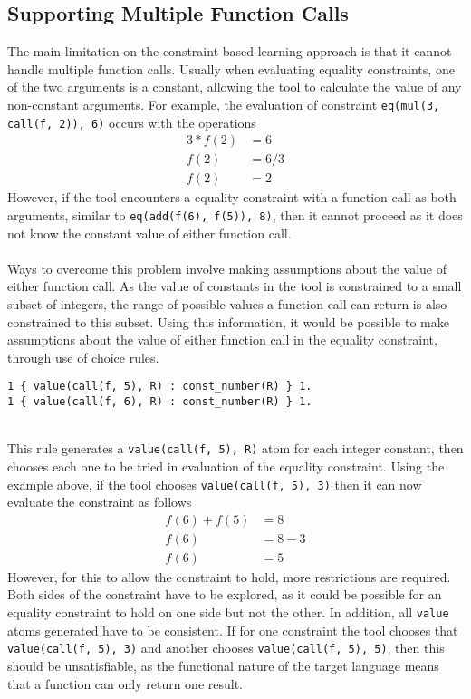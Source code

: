 \subsection{Supporting Multiple Function Calls}
The main limitation on the constraint based learning approach is that it cannot handle multiple function calls. Usually when evaluating equality constraints, one of the two arguments is a constant, allowing the tool to calculate the value of any non-constant arguments. For example, the evaluation of constraint \lstinline{eq(mul(3, call(f, 2)), 6)} occurs with the operations %
\begin{align*}
3 * f(2) &= 6 \\
f(2) &=  6 / 3 \\
f(2) &= 2
\end{align*}
However, if the tool encounters a equality constraint with a function call as both arguments, similar to \lstinline{eq(add(f(6), f(5)), 8)}, then it cannot proceed as it does not know the constant value of either function call. \\ \\%
Ways to overcome this problem involve making assumptions about the value of either function call. As the value of constants in the tool is constrained to a small subset of integers, the range of possible values a function call can return is also constrained to this subset. Using this information, it would be possible to make assumptions about the value of either function call in the equality constraint, through use of choice rules. \\
\begin{lstlisting}
1 { value(call(f, 5), R) : const_number(R) } 1. 
1 { value(call(f, 6), R) : const_number(R) } 1. 
\end{lstlisting}  
\mbox{} \\
This rule generates a \lstinline{value(call(f, 5), R)} atom for each integer constant, then chooses each one to be tried in evaluation of the equality constraint. Using the example above, if the tool chooses \lstinline{value(call(f, 5), 3)} then it can now evaluate the constraint as follows
\begin{align*}
f(6) + f(5) &= 8 \\
f(6) &= 8 - 3 \\
f(6) &= 5
\end{align*}
However, for this to allow the constraint to hold, more restrictions are required. Both sides of the constraint have to be explored, as it could be possible for an equality constraint to hold on one side but not the other. In addition, all \lstinline{value} atoms generated have to be consistent. If for one constraint the tool chooses that \lstinline{value(call(f, 5), 3)} and another chooses \lstinline{value(call(f, 5), 5)}, then this should be unsatisfiable, as the functional nature of the target language means that a function can only return one result. \\ \\ %
